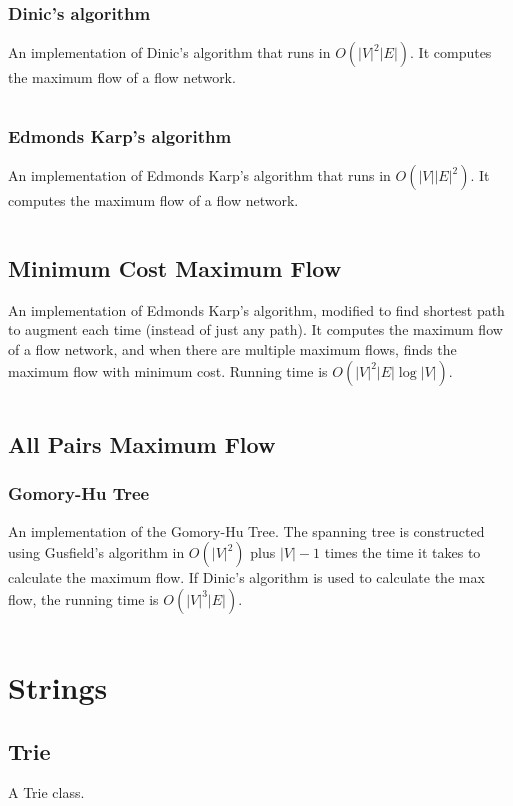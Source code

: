 \documentclass[9pt,a4paper,twocolumn,landscape,oneside]{amsart}
\newcommand{\code}[1]{\inputminted{cpp}{_code/#1}}
\begin{document}
        \subsubsection{Dinic's algorithm}
            An implementation of Dinic's algorithm that runs in
            $O(|V|^2|E|)$. It computes the maximum flow of a flow network.
            \code{graph/dinic.cpp}

        \subsubsection{Edmonds Karp's algorithm}
            An implementation of Edmonds Karp's algorithm that runs in
            $O(|V||E|^2)$. It computes the maximum flow of a flow network.
            \code{graph/edmonds_karps.cpp}

    \subsection{Minimum Cost Maximum Flow}
        An implementation of Edmonds Karp's algorithm, modified to find
        shortest path to augment each time (instead of just any path). It
        computes the maximum flow of a flow network, and when there are
        multiple maximum flows, finds the maximum flow with minimum cost. Running time is $O(|V|^2|E|\log|V|)$.
        \code{graph/edmonds_karps_mcmf.cpp}

    \subsection{All Pairs Maximum Flow}
        \subsubsection{Gomory-Hu Tree}
        An implementation of the Gomory-Hu Tree. The spanning tree is constructed using Gusfield's algorithm
        in $O(|V| ^ 2)$ plus $|V|-1$ times the time it takes to calculate the maximum flow.
        If Dinic's algorithm is used to calculate the max flow, the running time is $O(|V|^3|E|)$.
        \code{graph/gomory_hu_tree.cpp}

\section{Strings}
    \subsection{Trie}
        A Trie class.
        \code{strings/trie.cpp}
\end{document}
